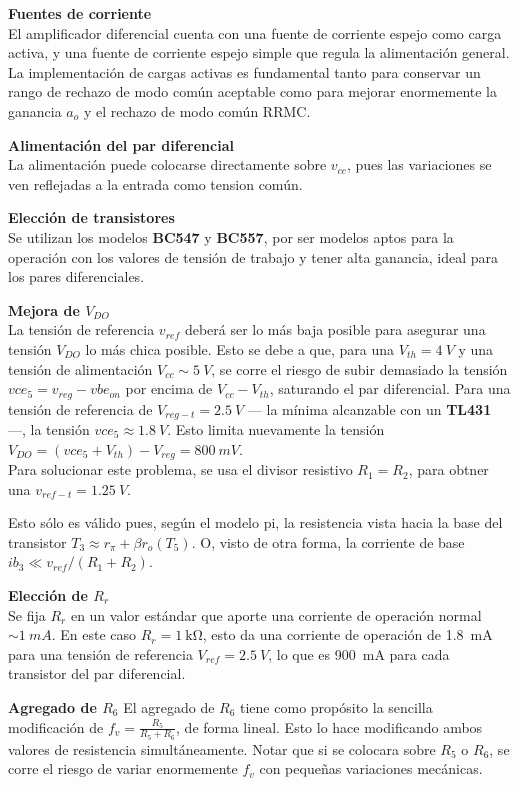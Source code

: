 \documentclass[]{article}
\begin{document}
\textbf{Fuentes de corriente}\\
El amplificador diferencial cuenta con una fuente de corriente espejo como carga activa, y una fuente de corriente espejo simple que regula la alimentación general. La implementación de cargas activas es fundamental tanto para conservar un rango de rechazo de modo común aceptable como para mejorar enormemente la ganancia $a_o$ y el rechazo de modo común RRMC.

\textbf{Alimentación del par diferencial}\\
La alimentación puede colocarse directamente sobre $v_{cc}$, pues las variaciones se ven reflejadas a la entrada como tension común.

\textbf{Elección de transistores}\\
Se utilizan los modelos \textbf{BC547} y \textbf{BC557}, por ser modelos aptos para la operación con los valores de tensión de trabajo y tener alta ganancia, ideal para los pares diferenciales.

\textbf{Mejora de $V_{DO}$}\\
La tensión de referencia $v_{ref}$ deberá ser lo más baja posible para asegurar una tensión $V_{DO}$ lo más chica posible. Esto se debe a que, para una $V_{th} = \SI{4}{V}$ y una tensión de alimentación $V_{cc} \sim \SI{5}{V}$, se corre el riesgo de subir demasiado la tensión $vce_5 = v_{reg} - vbe_{on}$ por encima de $V_{cc} - V_{th}$, saturando el par diferencial. Para una tensión de referencia de $V_{reg-t} = \SI{2.5}{V}$ --- la mínima alcanzable con un \textbf{TL431} ---, la tensión $vce_5 \approx \SI{1.8}{V}$. Esto limita nuevamente la tensión $V_{DO} = (vce_5 + V_{th}) - V_{reg} = \SI{800}{mV}$. \\ Para solucionar este problema, se usa el divisor resistivo $R_1 = R_2$, para obtner una $v_{ref-t} = \SI{1.25}{V}$.

Esto sólo es válido pues, según el modelo pi, la resistencia vista hacia la base del transistor $T_3 \approx r_{\pi} + \beta r_o (T_5)$. O, visto de otra forma, la corriente de base $ib_3 \ll v_{ref} / (R_1+R_2)$.

\textbf{Elección de $R_r$}\\
Se fija $R_r$ en un valor estándar que aporte una corriente de operación normal $\sim \SI{1}{mA}$. En este caso $R_r = \SI{1}{\kilo\ohm}$, esto da una corriente de operación de \SI{1,8}{mA} para una tensión de referencia $V_{ref} = \SI{2,5}{V}$, lo que es \SI{900}{mA} para cada transistor del par diferencial.

\textbf{Agregado de $R_6$}
El agregado de $R_6$ tiene como propósito la sencilla modificación de $f_v = \frac{R_5}{R_5+R_6}$, de forma lineal. Esto lo hace modificando ambos valores de resistencia simultáneamente. Notar que si se colocara sobre $R_5$ o $R_6$, se corre el riesgo de variar enormemente $f_v$ con pequeñas variaciones mecánicas.
\FloatBarrier
\end{document}
